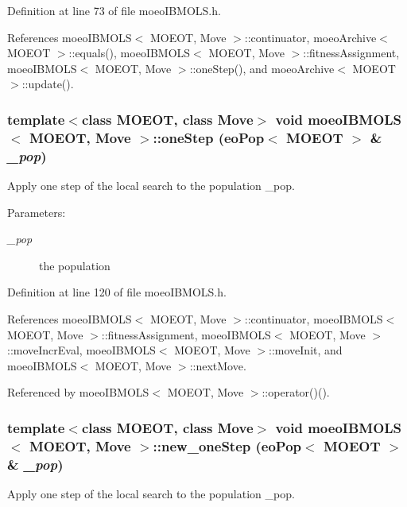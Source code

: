 Definition at line 73 of file moeo\-IBMOLS.h.

References moeo\-IBMOLS$<$ MOEOT, Move $>$::continuator, moeo\-Archive$<$ MOEOT $>$::equals(), moeo\-IBMOLS$<$ MOEOT, Move $>$::fitness\-Assignment, moeo\-IBMOLS$<$ MOEOT, Move $>$::one\-Step(), and moeo\-Archive$<$ MOEOT $>$::update().
\subsubsection{\setlength{\rightskip}{0pt plus 5cm}template$<$class MOEOT, class Move$>$ void \bf{moeo\-IBMOLS}$<$ MOEOT, Move $>$::one\-Step (\bf{eo\-Pop}$<$ MOEOT $>$ \& {\em \_\-pop})\hspace{0.3cm}{\tt  [inline, private]}}\label{classmoeoIBMOLS_fce770398602972b5d67c52638687d43}


Apply one step of the local search to the population \_\-pop. 

\begin{Desc}
\item[Parameters:]
\begin{description}
\item[{\em \_\-pop}]the population \end{description}
\end{Desc}


Definition at line 120 of file moeo\-IBMOLS.h.

References moeo\-IBMOLS$<$ MOEOT, Move $>$::continuator, moeo\-IBMOLS$<$ MOEOT, Move $>$::fitness\-Assignment, moeo\-IBMOLS$<$ MOEOT, Move $>$::move\-Incr\-Eval, moeo\-IBMOLS$<$ MOEOT, Move $>$::move\-Init, and moeo\-IBMOLS$<$ MOEOT, Move $>$::next\-Move.

Referenced by moeo\-IBMOLS$<$ MOEOT, Move $>$::operator()().
\subsubsection{\setlength{\rightskip}{0pt plus 5cm}template$<$class MOEOT, class Move$>$ void \bf{moeo\-IBMOLS}$<$ MOEOT, Move $>$::new\_\-one\-Step (\bf{eo\-Pop}$<$ MOEOT $>$ \& {\em \_\-pop})\hspace{0.3cm}{\tt  [inline, private]}}\label{classmoeoIBMOLS_9d811733d8e7508a7c48615c8ff0f990}


Apply one step of the local search to the population \_\-pop. 


